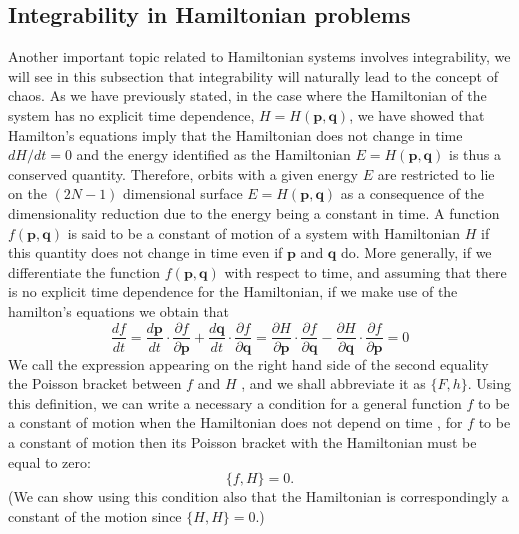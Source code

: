 \subsection{Integrability in Hamiltonian problems}
Another important topic related to Hamiltonian systems involves integrability, we will see in this subsection that integrability will naturally lead to the concept of chaos. As we have previously stated, in the case where the Hamiltonian of the system has no explicit time dependence, $H=H(\bm{p},\bm{q})$, we have showed that Hamilton's equations imply that the Hamiltonian does not change in time $dH/dt=0$ and the energy identified as the Hamiltonian $E=H(\bm{p},\bm{q})$ is thus a conserved quantity. Therefore, orbits with a given energy $E$ are restricted to lie on the $(2N-1)$ dimensional surface $E=H(\bm{p},\bm{q})$ as a consequence of the dimensionality reduction due to the energy being a constant in time. A function $f(\bm{p},\bm{q})$ is said to be a constant of motion of a system with Hamiltonian $H$ if this quantity does not change in time even if $\bm{p}$ and $\bm{q}$ do. More generally, if we differentiate the function $f(\bm{p},\bm{q})$ with respect to time, and assuming that there is no explicit time dependence for the Hamiltonian, if we make use of the hamilton's equations we obtain that
\begin{equation}
\frac{df}{dt}=\frac{d\bm{p}}{dt}\cdot\frac{\partial f}{\partial \bm{p}}+\frac{d\bm{q}}{dt}\cdot\frac{\partial f}{\partial \bm{q}}= \frac{\partial H}{\partial \bm{p}}\cdot\frac{\partial f}{\partial \bm{q}}-\frac{\partial H}{\partial \bm{q}}\cdot\frac{\partial f}{\partial \bm{p}}=0
\end{equation}
We call the expression appearing on the right hand side of the second equality the Poisson bracket between  $f$ and $H$ \cite{goldstein2002classical}, and we shall abbreviate it as $\{F,h\}$. Using this definition, we can write a necessary a condition for a general function $f$ to be a constant of motion when the Hamiltonian does not depend on time \cite{zaslavsky2005hamiltonian}, for $f$ to be a constant of motion then its Poisson bracket with the Hamiltonian must be equal to zero:
\begin{equation}
\{ f,H\} =0.
\end{equation}
(We can show using this condition also that the Hamiltonian is correspondingly a constant of the motion since $\{H,H\}=0$.)\par

